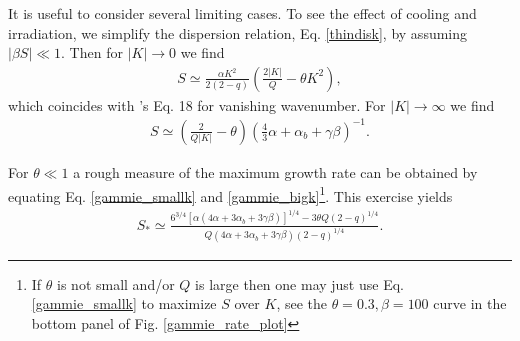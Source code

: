 It is useful to consider several limiting cases.
To see the effect of cooling and irradiation, we simplify the
dispersion relation, Eq. \ref{thindisk}, by assuming $|\beta S|\ll
1$. Then for $|K| \to 0$ we find
\begin{align}\label{gammie_smallk}
  S\simeq \frac{\alpha K^2}{2(2-q)}\left(\frac{2|K|}{Q} - \theta
  K^2\right), 
\end{align}
which coincides with \citeauthor{gammie96}'s Eq. 18 for vanishing
wavenumber. For $|K|\to\infty$ we find
\begin{align}\label{gammie_bigk}
  S \simeq\left(\frac{2}{Q|K|} - \theta\right)\left(\frac{4}{3}\alpha + 
  \alpha_b + \gamma\beta\right)^{-1}.
\end{align}


For $\theta\ll1$ a rough measure of the maximum growth rate can be obtained by
equating Eq. \ref{gammie_smallk} and \ref{gammie_bigk}\footnote{If
  $\theta$ is not small and/or $Q$  is large then one may just use Eq. \ref{gammie_smallk}
  to maximize $S$ over $K$, see the $\theta=0.3,\beta=100$ curve in the bottom
  panel of Fig. \ref{gammie_rate_plot}}.  
This exercise yields 
\begin{align}\label{gammie_maxrate_simple}
  S_*\simeq \frac{
    6^{3/4}\left[\alpha\left(4\alpha +
      3\alpha_b + 3\gamma\beta\right)\right]^{1/4} - 3\theta
    Q(2-q)^{1/4}}{Q\left(4\alpha + 3\alpha_b +
    3\gamma\beta\right)(2-q)^{1/4}}. 
\end{align} 


